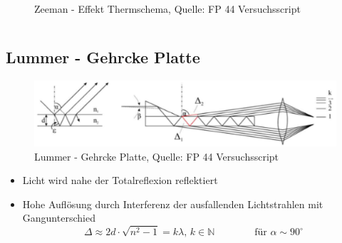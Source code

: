 \begin{myframe}{\subsecname}
\begin{columns}
\begin{column}{0.48\textwidth}
\begin{figure}
                            \caption{Zeeman - Effekt Thermschema, Quelle: FP 44 Versuchsscript}
                            \label{zeemanEffektScheme}
                        \end{figure}
                    \end{column}
                \end{columns}

        \end{myframe}



    \subsection{Lummer - Gehrcke Platte}
        \begin{myframe}{\subsecname}
            \begin{figure}
                \includegraphics[width=0.8\linewidth]{img/lummerGehrckePlate.png}
                \caption{Lummer - Gehrcke Platte, Quelle: FP 44 Versuchsscript}
                \label{lummerGehrckePlate}
            \end{figure}
            \begin{itemize}
                \item Licht wird nahe der Totalreflexion reflektiert
                \item Hohe Auflösung durch Interferenz der ausfallenden Lichtstrahlen mit Gangunterschied
                    \begin{equation*}
                        \Delta \approx 2d \cdot \sqrt{n^2 - 1} = k \lambda \text{, } k \in \mathbb{N} \qquad \qquad \text{für } \alpha \sim 90^{\circ}
                    \end{equation*}
            \end{itemize}
        \end{myframe}



